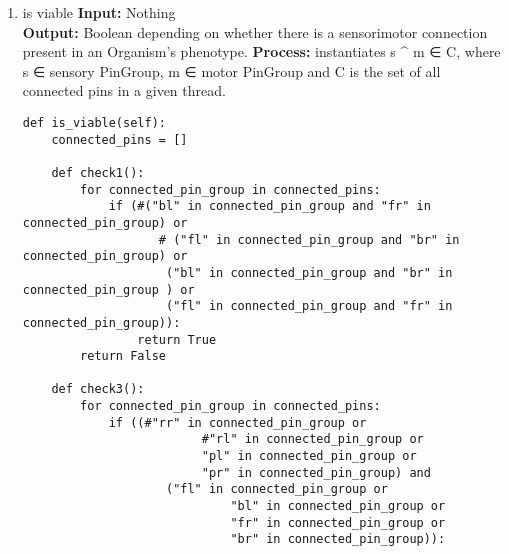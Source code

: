 \documentclass[a4paper]{article}
\begin{document}
\begin{enumerate}
$$\begin{verbatim}
    for running in self.threads:             
        if len(running.connected_pins) % 2 != 0:# and \
                #len(running.connected_pins) >= 1:
            x =len(running.connected_pins)- 1
            to_remove =  running.connected_pins[-1]
            to_remove.available = True
            running.connected_pins.remove(to_remove)
            #running.connected_pins[len(running.connected_pins) - 1].available = True
            connections_copy = [n for n in self.connections] #deepcopy that we can manipulate
                                                            #with impunity
            for n in self.connections:
                if (n.group_id == to_remove.group_id and\
                    n.number == to_remove.number):
                    connections_copy.remove(n)
            self.connections = connections_copy
            #running.connected_pins = [running.connected_pins[i] for i in range(x - 1)]
            #print 'thread stuff \n' +  [i.group_id for i in running.connected_pins]
        else:
            #for running in running_threads:
            pass
\end{verbatim}
\item is viable
\label{sec-7-3-1-6}
\textbf{Input:} Nothing\\
\textbf{Output:} Boolean depending on whether there is a sensorimotor connection 
present in an Organism’s phenotype.
\textbf{Process:} instantiates  s \^{} m ∈ C, where s ∈ sensory PinGroup, m ∈ motor PinGroup and C is 
the set of all connected pins in a given thread.\\

\begin{verbatim}
def is_viable(self):
    connected_pins = []

    def check1():
        for connected_pin_group in connected_pins:
            if (#("bl" in connected_pin_group and "fr" in connected_pin_group) or
                   # ("fl" in connected_pin_group and "br" in connected_pin_group) or
                    ("bl" in connected_pin_group and "br" in connected_pin_group ) or
                    ("fl" in connected_pin_group and "fr" in connected_pin_group)):
                return True
        return False

    def check3():
        for connected_pin_group in connected_pins:
            if ((#"rr" in connected_pin_group or
                         #"rl" in connected_pin_group or
                         "pl" in connected_pin_group or
                         "pr" in connected_pin_group) and
                    ("fl" in connected_pin_group or
                             "bl" in connected_pin_group or
                             "fr" in connected_pin_group or
                             "br" in connected_pin_group)):


\end{verbatim}
\end{enumerate}
\end{document}
